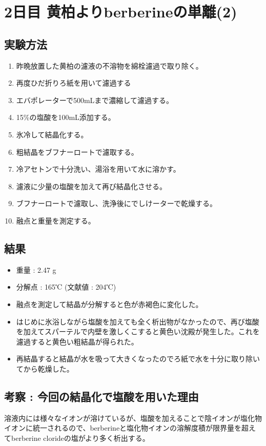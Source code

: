 \documentclass[a4paper,papersize,dvipdfmx]{jsarticle}
\begin{document}
\section*{2日目 黄柏よりberberineの単離(2)}
\subsection*{実験方法}
\begin{enumerate}
\item 昨晩放置した黄柏の濾液の不溶物を綿栓濾過で取り除く。
\item 再度ひだ折りろ紙を用いて濾過する
\item エバポレーターで500mLまで濃縮して濾過する。
\item 15\%の塩酸を100mL添加する。
\item 氷冷して結晶化する。
\item 粗結晶をブフナーロートで濾取する。
\item 冷アセトンで十分洗い、湯浴を用いて水に溶かす。
\item 濾液に少量の塩酸を加えて再び結晶化させる。
\item ブフナーロートで濾取し、洗浄後にでしけーターで乾燥する。
\item 融点と重量を測定する。

\end{enumerate}
\subsection*{結果}
\begin{itemize}
\item 重量 : 2.47 g
\item 分解点 : 165℃ (文献値 : 204℃)
\item 融点を測定して結晶が分解すると色が赤褐色に変化した。
\item はじめに氷浴しながら塩酸を加えても全く析出物がなかったので、再び塩酸を加えてスパーテルで内壁を激しくこすると黄色い沈殿が発生した。これを濾過すると黄色い粗結晶が得られた。
\item 再結晶すると結晶が水を吸って大きくなったのでろ紙で水を十分に取り除いてから乾燥した。

\end{itemize}
\subsection*{考察 : 今回の結晶化で塩酸を用いた理由}
溶液内には様々なイオンが溶けているが、塩酸を加えることで陰イオンが塩化物イオンに統一されるので、berberineと塩化物イオンの溶解度積が限界量を超えてberberine clorideの塩がより多く析出する。
\end{document}
